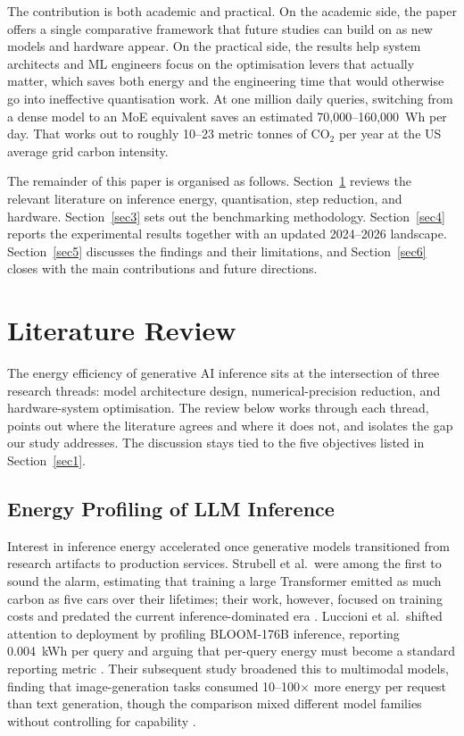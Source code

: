 \documentclass[AMS,STIX2COL]{WileyNJD-v2}
\begin{document}
The contribution is both academic and practical. On the academic side, the paper offers a single comparative framework that future studies can build on as new models and hardware appear. On the practical side, the results help system architects and ML engineers focus on the optimisation levers that actually matter, which saves both energy and the engineering time that would otherwise go into ineffective quantisation work. At one million daily queries, switching from a dense model to an MoE equivalent saves an estimated 70,000--160,000~Wh per day. That works out to roughly 10--23 metric tonnes of CO$_2$ per year at the US average grid carbon intensity.

The remainder of this paper is organised as follows. Section~\ref{sec2} reviews the relevant literature on inference energy, quantisation, step reduction, and hardware. Section~\ref{sec3} sets out the benchmarking methodology. Section~\ref{sec4} reports the experimental results together with an updated 2024--2026 landscape. Section~\ref{sec5} discusses the findings and their limitations, and Section~\ref{sec6} closes with the main contributions and future directions.


\section{Literature Review}\label{sec2}

The energy efficiency of generative AI inference sits at the intersection of three research threads: model architecture design, numerical-precision reduction, and hardware-system optimisation. The review below works through each thread, points out where the literature agrees and where it does not, and isolates the gap our study addresses. The discussion stays tied to the five objectives listed in Section~\ref{sec1}.

\subsection{Energy Profiling of LLM Inference}

Interest in inference energy accelerated once generative models transitioned from research artifacts to production services. Strubell et al.\ were among the first to sound the alarm, estimating that training a large Transformer emitted as much carbon as five cars over their lifetimes; their work, however, focused on training costs and predated the current inference-dominated era \cite{strubell2019energy}. Luccioni et al.\ shifted attention to deployment by profiling BLOOM-176B inference, reporting 0.004~kWh per query and arguing that per-query energy must become a standard reporting metric \cite{luccioni2023power}. Their subsequent study broadened this to multimodal models, finding that image-generation tasks consumed 10--100$\times$ more energy per request than text generation, though the comparison mixed different model families without controlling for capability \cite{luccioni2024power}.
\end{document}
